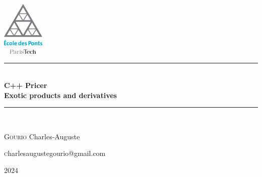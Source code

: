 \documentclass[11pt,a4paper]{article}
\begin{document}
\newcommand{\E}{\mathrm{E}}
\newcommand{\Var}{\mathrm{Var}}
\newcommand{\Cov}{\mathrm{Cov}}
\newcommand{\blue}{\color{blue}}
\newcommand{\red}{\color{red}}
\newcommand{\black}{\color{black}}
\newcommand{\orange}{\color{orange}}
\newcommand{\green}{\color{green}}

\newcommand{\HRule}{\rule{\linewidth}{0.5mm}}

\begin{titlepage}
\begin{center}

\includegraphics[width=0.15\textwidth]{logo.jpg}~\\[1cm]

\HRule \\[0.4cm]

{
\bfseries 
\huge{C++ Pricer} \\[0.4cm]
\LARGE{Exotic products and derivatives}\\[0.4cm]}
\HRule \\[0.5cm]

\begin{minipage}{0.4\textwidth}
\begin{flushleft} \large
\textsc{Gourio} Charles-Auguste\\

\end{flushleft}
\end{minipage}
\begin{minipage}{0.4\textwidth}
\begin{flushright} \large
\textsc charlesaugustegourio@gmail.com\\
\end{flushright}
\end{minipage}


\vspace{0.5 in }
{\large 2024}

\end{center}
\end{titlepage}
\end{document}
